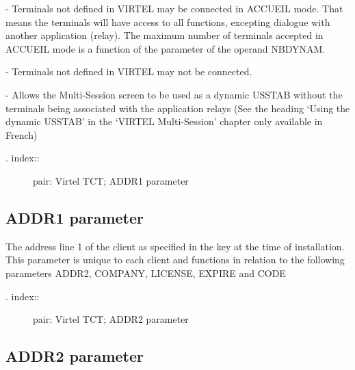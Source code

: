 \documentclass[letterpaper,10pt,english]{sphinxmanual}
\begin{document}
 - Terminals not defined in VIRTEL may be connected in ACCUEIL mode. That means the terminals will have access to all functions, excepting dialogue with another application (relay). The maximum number of terminals accepted in ACCUEIL mode is a function of the parameter of the operand NBDYNAM.

 - Terminals not defined in VIRTEL may not be connected.

 - Allows the Multi-Session screen to be used as a dynamic USSTAB without the terminals being associated with the application relays (See the heading ‘Using the dynamic USSTAB’ in the ‘VIRTEL Multi-Session’ chapter only available in French)
\begin{description}
\item[{. index::}] \leavevmode
pair: Virtel TCT; ADDR1 parameter

\end{description}


\subsection{ADDR1 parameter}
\label{\detokenize{Installation_Guide:addr1-parameter}}
\begin{sphinxVerbatim}[commandchars=\\\{\}]
 
\end{sphinxVerbatim}

The address line 1 of the client as specified in the key at the time of installation. This parameter is unique to each client and functions in relation to the following parameters ADDR2, COMPANY, LICENSE, EXPIRE and CODE
\begin{description}
\item[{. index::}] \leavevmode
pair: Virtel TCT; ADDR2 parameter

\end{description}


\subsection{ADDR2 parameter}
\label{\detokenize{Installation_Guide:addr2-parameter}}
\begin{sphinxVerbatim}[commandchars=\\\{\}]
 
\end{sphinxVerbatim}
\end{document}
